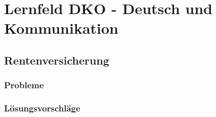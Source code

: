 \section{Lernfeld DKO - Deutsch und Kommunikation}

\subsection{Rentenversicherung}

\subsubsection{Probleme}

\subsubsection{Lösungsvorschläge}